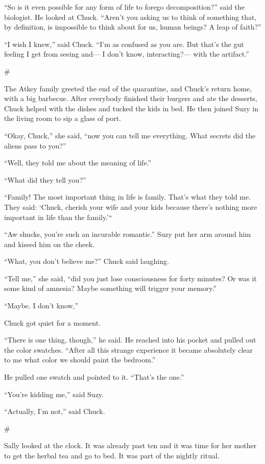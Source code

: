 \documentclass[12pt]{book}
\newcommand{\sbreak}{
\begin{center}
  \#
\end{center}
}
\begin{document}
``So is it even possible for any form of life to forego decomposition?'' said the biologist. He looked at Chuck. ``Aren't you asking us to think of something that, by definition, is impossible to think about for us, human beings? A leap of faith?''

``I wish I knew,'' said Chuck. ``I'm as confused as you are. But that's the gut feeling I get from seeing and--- I don't know, interacting?--- with the artifact.''


\sbreak

The Atkey family greeted the end of the quarantine, and Chuck's return home, with a big barbecue. After everybody finished their burgers and ate the desserts, Chuck helped with the dishes and tucked the kids in bed. He then joined Suzy in the living room to sip a glass of port. 

``Okay, Chuck,'' she said, ``now you can tell me everything. What secrets did the aliens pass to you?''

``Well, they told me about the meaning of life.''

``What did they tell you?''

``Family! The most important thing in life is family. That's what they told me. They said: `Chuck, cherish your wife and your kids because there's nothing more important in life than the family.'``

``Aw shucks, you're such an incurable romantic.'' Suzy put her arm around him and kissed him on the cheek.

``What, you don't believe me?'' Chuck said laughing.

``Tell me,'' she said, ``did you just lose consciousness for forty minutes? Or was it some kind of amnesia? Maybe something will trigger your memory.''

``Maybe. I don't know,'' 

Chuck got quiet for a moment. 

``There is one thing, though,'' he said. He reached into his pocket and pulled out the color swatches. ``After all this strange experience it became absolutely clear to me what color we should paint the bedroom.'' 

He pulled one swatch and pointed to it. ``That's the one.''

``You're kidding me,'' said Suzy.

``Actually, I'm not,'' said Chuck.

\sbreak

Sally looked at the clock. It was already past ten and it was time for her mother to get the herbal tea and go to bed. It was part of the nightly ritual.
\end{document}
